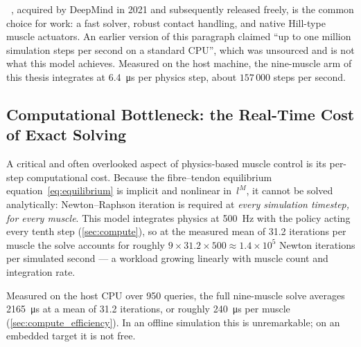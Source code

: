 \MuJoCo{}~\parencite{Todorov2012}, acquired by DeepMind in 2021 and subsequently
released freely, is the common choice for \DRL{} work: a fast solver, robust
contact handling, and native Hill-type muscle actuators. An earlier version of this
paragraph claimed ``up to one million simulation steps per second on a standard
CPU'', which was unsourced and is not what this model achieves. Measured on the
host machine, the nine-muscle arm of this thesis integrates at
\SI{6.4}{\micro\second} per physics step, about $157\,000$ steps per second.

\subsection{Computational Bottleneck: the Real-Time Cost of Exact Solving}
\label{sec:compute_bottleneck}

A critical and often overlooked aspect of physics-based muscle control is its
per-step computational cost. Because the fibre--tendon equilibrium
equation~\eqref{eq:equilibrium} is implicit and nonlinear in~$l^M$, it cannot be
solved analytically: Newton--Raphson iteration is required at \emph{every
simulation timestep, for every muscle}. This model integrates physics at
\SI{500}{\hertz} with the policy acting every tenth step
(\cref{sec:compute}), so at the measured mean of 31.2 iterations per muscle the
solve accounts for roughly $9 \times 31.2 \times 500 \approx 1.4 \times 10^5$
Newton iterations per simulated second --- a workload growing linearly with
muscle count and integration rate.

Measured on the host CPU over 950 queries, the full nine-muscle solve averages
\SI{2165}{\micro\second} at a mean of 31.2 iterations, or roughly
\SI{240}{\micro\second} per muscle (\cref{sec:compute_efficiency}). In an offline
simulation this is unremarkable; on an embedded target it is not free.

